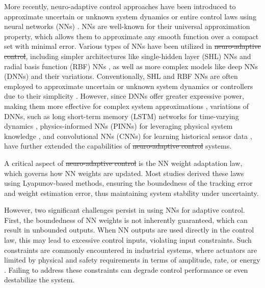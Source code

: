 \documentclass[letterpaper, journal]{IEEEtran}
\providecommand{\DIFadd}[1]{{\protect\color{blue}\uwave{#1}}} %
\providecommand{\DIFdel}[1]{{\protect\color{red}\sout{#1}}} %
\providecommand{\DIFaddbegin}{} %
\providecommand{\DIFaddend}{} %
\providecommand{\DIFdelbegin}{} %
\providecommand{\DIFdelend}{} %
\begin{document}
More recently, neuro-adaptive control \DIFaddbegin \DIFadd{(NAC) }\DIFaddend approaches have been introduced to approximate uncertain or unknown system dynamics or entire control laws using neural networks (NNs) \cite{Lewis:1998aa,Farrell:2006aa}. 
NNs are well-known for their universal approximation property, which allows them to approximate any smooth function over a compact set with minimal error. 
Various types of NNs have been utilized in \DIFdelbegin \DIFdel{neuro-adaptive control}\DIFdelend \DIFaddbegin \DIFadd{NAC}\DIFaddend , including simpler architectures like single-hidden layer (SHL) NNs \cite{Lewis:1996aa,Ge:2010aa, Yesildirek:1995aa} and radial basis function (RBF) NNs \cite{Liu:2013ab,Ge:2002aa}, as well as more complex models like deep NNs (DNNs) \cite{Patil:2022aa} and their variations. 
Conventionally, SHL and RBF NNs are often employed to approximate uncertain or unknown system dynamics or controllers due to their simplicity \cite{Esfandiari:2014aa,Esfandiari:2015aa,Yesildirek:1995aa,Gao:2006aa}.
However, since DNNs offer greater expressive power, making them more effective for complex system approximations \cite{Rolnick:2018aa}, variations of DNNs, such as long short-term memory (LSTM) networks for time-varying dynamics \cite{Griffis:2023aa}, physics-informed NNs (PINNs) for leveraging physical system knowledge \cite{Hart:2024aa}, and convolutional NNs (CNNs) for learning historical sensor data \cite{Ryu:2024ac}, have further extended the capabilities of \DIFdelbegin \DIFdel{neuro-adaptive control }\DIFdelend \DIFaddbegin \DIFadd{NAC }\DIFaddend systems.

A critical aspect of \DIFdelbegin \DIFdel{neuro-adaptive control }\DIFdelend \DIFaddbegin \DIFadd{NAC }\DIFaddend is the NN weight adaptation law, which governs how NN weights are updated. 
Most studies derived these laws using Lyapunov-based methods, ensuring the boundedness of the tracking error and weight estimation error, thus maintaining system stability under uncertainty.

However, two significant challenges persist in using NNs for adaptive control. 
First, the boundedness of NN weights is not inherently guaranteed, which can result in unbounded outputs. 
When NN outputs are used directly in the control law, this may lead to excessive control inputs, violating input constraints. 
Such constraints are commonly encountered in industrial systems, where actuators are limited by physical and safety requirements in terms of amplitude, rate, or energy \cite{Esfandiari:2021aa}. 
Failing to address these constraints can degrade control performance or even destabilize the system.
\end{document}

